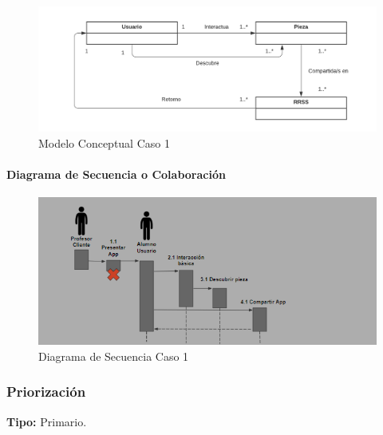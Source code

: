\begin{figure}[H]
\centerline{\includegraphics[width=15cm]{imgs/ModeloConceptualCaso_1_3.png}}
\caption{Modelo Conceptual Caso 1}
\label{fig_1_2}
\end{figure}

\paragraph{Diagrama de Secuencia o Colaboración}

\begin{figure}[H]
\centerline{\includegraphics[width=15cm]{imgs/CasoUso_1_2.PNG}}
\caption{Diagrama de Secuencia Caso 1}
\label{fig_1_3}
\end{figure}

\subsubsection{Priorización}
{\textbf {Tipo:}}
Primario.